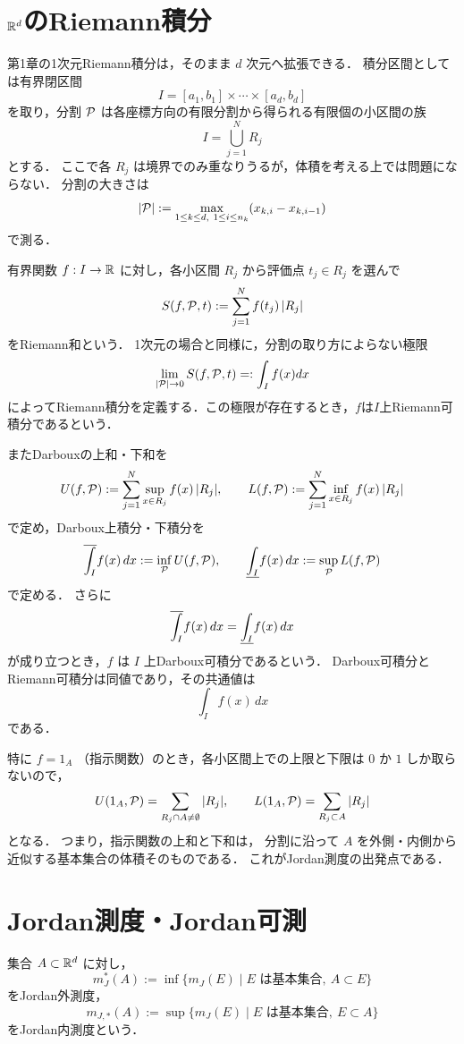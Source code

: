 \section{\texorpdfstring{$\mathbb R^d$}{Rd}のRiemann積分}

第1章の1次元Riemann積分は，そのまま $d$ 次元へ拡張できる．
積分区間としては有界閉区間
\[
I = [a_1,b_1] \times \cdots \times [a_d,b_d]
\]
を取り，分割 $\mathcal P$ は各座標方向の有限分割から得られる有限個の小区間の族
\[
I = \bigcup_{j=1}^N R_j
\]
とする．
ここで各 $R_j$ は境界でのみ重なりうるが，体積を考える上では問題にならない．
分割の大きさは
\[
|\mathcal P| := \max_{1 \le k \le d,\ 1 \le i \le n_k} (x_{k,i}-x_{k,i-1})
\]
で測る．

有界関数 $f : I \to \mathbb R$ に対し，各小区間 $R_j$ から評価点 $t_j \in R_j$ を選んで
\[
S(f,\mathcal P,t) := \sum_{j=1}^N f(t_j)\,|R_j|
\]
をRiemann和という．
1次元の場合と同様に，分割の取り方によらない極限
\[
\lim_{|\mathcal P| \to 0} S(f,\mathcal P,t) =: \int_I f(x) dx
\]
によってRiemann積分を定義する．この極限が存在するとき，$f$は$I$上Riemann可積分であるという．

またDarbouxの上和・下和を
\[
U(f,\mathcal P) := \sum_{j=1}^N \sup_{x \in R_j} f(x)\,|R_j|,
\qquad
L(f,\mathcal P) := \sum_{j=1}^N \inf_{x \in R_j} f(x)\,|R_j|
\]
で定め，Darboux上積分・下積分を
\[
\overline{\int_{I}^{}} f(x)\,dx := \inf_{\mathcal P} U(f,\mathcal P),
\qquad
\underline{\int_{I}^{}} f(x)\,dx := \sup_{\mathcal P} L(f,\mathcal P)
\]
で定める．
さらに
\[
\overline{\int_{I}^{}} f(x)\,dx = \underline{\int_{I}^{}} f(x)\,dx
\]
が成り立つとき，$f$ は $I$ 上Darboux可積分であるという．
Darboux可積分とRiemann可積分は同値であり，その共通値は
\[
\int_I f(x)\,dx
\]
である．

特に $f = 1_A$ （指示関数）のとき，各小区間上での上限と下限は $0$ か $1$ しか取らないので，
\[
U(1_A,\mathcal P)
= \sum_{R_j \cap A \neq \emptyset} |R_j|,
\qquad
L(1_A,\mathcal P)
= \sum_{R_j \subset A} |R_j|
\]
となる．
つまり，指示関数の上和と下和は，
分割に沿って $A$ を外側・内側から近似する基本集合の体積そのものである．
これがJordan測度の出発点である．

\section{Jordan測度・Jordan可測}

\begin{definition}[Jordan外測度とJordan内測度]
集合 $A \subset \mathbb R^d$ に対し，
\[
m_J^*(A)
:=
\inf\{m_J(E) \mid E \text{ は基本集合},\ A \subset E\}
\]
をJordan外測度，
\[
m_{J,*}(A)
:=
\sup\{m_J(E) \mid E \text{ は基本集合},\ E \subset A\}
\]
をJordan内測度という．
\end{definition}

